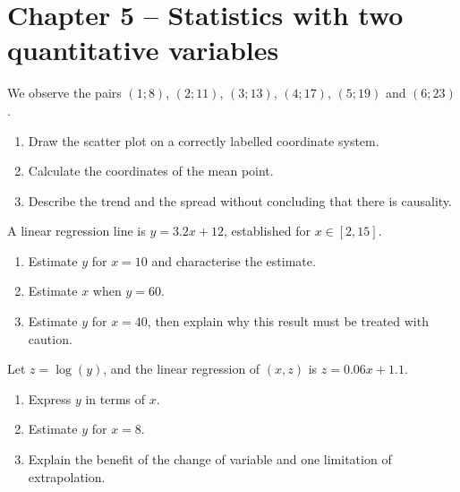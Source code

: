 \section*{Chapter 5 -- Statistics with two quantitative variables}
\begin{exercice}
We observe the pairs $(1;8)$, $(2;11)$, $(3;13)$, $(4;17)$, $(5;19)$ and $(6;23)$.
\begin{enumerate}
\item Draw the scatter plot on a correctly labelled coordinate system.
\item Calculate the coordinates of the mean point.
\item Describe the trend and the spread without concluding that there is causality.
\end{enumerate}
\end{exercice}
\begin{exercice}
A linear regression line is $y=3.2x+12$, established for $x\in[2,15]$.
\begin{enumerate}
\item Estimate $y$ for $x=10$ and characterise the estimate.
\item Estimate $x$ when $y=60$.
\item Estimate $y$ for $x=40$, then explain why this result must be treated with caution.
\end{enumerate}
\end{exercice}
\begin{exercice}
Let $z=\log(y)$, and the linear regression of $(x,z)$ is $z=0.06x+1.1$.
\begin{enumerate}
\item Express $y$ in terms of $x$.
\item Estimate $y$ for $x=8$.
\item Explain the benefit of the change of variable and one limitation of extrapolation.
\end{enumerate}
\end{exercice}

